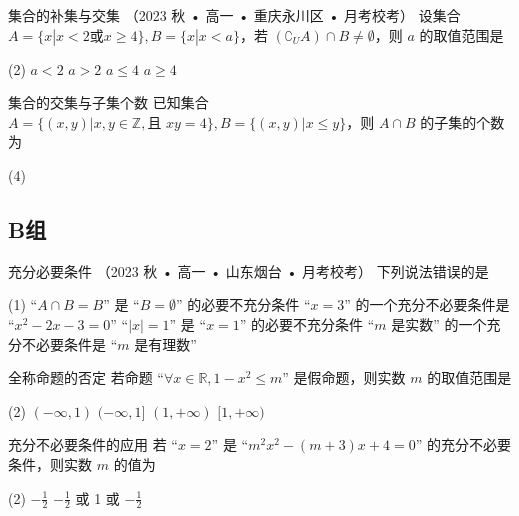 \begin{choice}{}{集合的补集与交集}
	{（2023 秋 • 高一 • 重庆永川区 • 月考校考）} 设集合 $A=\{x|x<2 \text{或} x \ge 4\}, B=\{x|x<a\}$，若 $(\complement_U A) \cap B \neq \emptyset$，则 $a$ 的取值范围是
	\begin{tasks}(2)
		\task $a < 2$
		\task $a > 2$
		\task $a \le 4$
		\task $a \ge 4$
	\end{tasks}
\end{choice}

\begin{choice}{}{集合的交集与子集个数}
	已知集合 $A=\{(x,y) | x,y \in \mathbb{Z}, \text{且 } xy=4\}, B=\{(x,y) | x \le y\}$，则 $A \cap B$ 的子集的个数为
	\begin{tasks}(4)
	\end{tasks}
\end{choice}

\subsection*{B组}

\begin{choice}{}{充分必要条件}
	{（2023 秋 • 高一 • 山东烟台 • 月考校考）} 下列说法错误的是
	\begin{tasks}(1)
		\task ``$A \cap B = B$'' 是 ``$B = \emptyset$'' 的必要不充分条件
		\task ``$x=3$'' 的一个充分不必要条件是 ``$x^2-2x-3=0$''
		\task ``$|x|=1$'' 是 ``$x=1$'' 的必要不充分条件
		\task ``$m$ 是实数'' 的一个充分不必要条件是 ``$m$ 是有理数''
	\end{tasks}
\end{choice}

\begin{choice}{}{全称命题的否定}
	若命题 ``$\forall x \in \mathbb{R}, 1-x^2 \le m$'' 是假命题，则实数 $m$ 的取值范围是
	\begin{tasks}(2)
		\task $(-\infty, 1)$
		\task $(-\infty, 1]$
		\task $(1, +\infty)$
		\task $[1, +\infty)$
	\end{tasks}
\end{choice}

\begin{choice}{}{充分不必要条件的应用}
	若 ``$x=2$'' 是 ``$m^2x^2 - (m+3)x + 4 = 0$'' 的充分不必要条件，则实数 $m$ 的值为
	\begin{tasks}(2)
		\task $-\frac{1}{2}$
		\task $-\frac{1}{2}$ 或 1
		 或 $-\frac{1}{2}$
	\end{tasks}
\end{choice}

